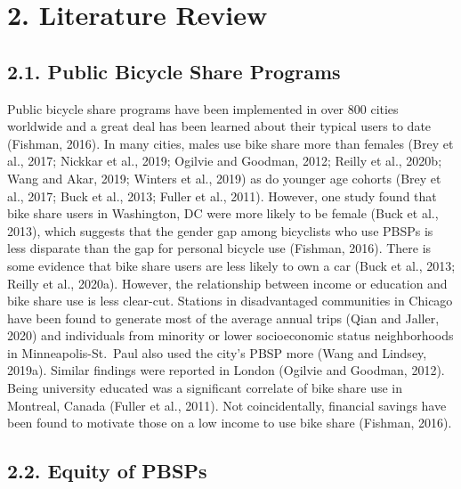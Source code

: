 \documentclass[]{elsarticle} %
\begin{document}
\hypertarget{literature-review}{%
\section{2. Literature Review}\label{literature-review}}

\hypertarget{public-bicycle-share-programs}{%
\subsection{2.1. Public Bicycle Share
Programs}\label{public-bicycle-share-programs}}

Public bicycle share programs have been implemented in over 800 cities
worldwide and a great deal has been learned about their typical users to
date (Fishman, 2016). In many cities, males use bike share more than
females (Brey et al., 2017; Nickkar et al., 2019; Ogilvie and Goodman,
2012; Reilly et al., 2020b; Wang and Akar, 2019; Winters et al., 2019)
as do younger age cohorts (Brey et al., 2017; Buck et al., 2013; Fuller
et al., 2011). However, one study found that bike share users in
Washington, DC were more likely to be female (Buck et al., 2013), which
suggests that the gender gap among bicyclists who use PBSPs is less
disparate than the gap for personal bicycle use (Fishman, 2016). There
is some evidence that bike share users are less likely to own a car
(Buck et al., 2013; Reilly et al., 2020a). However, the relationship
between income or education and bike share use is less clear-cut.
Stations in disadvantaged communities in Chicago have been found to
generate most of the average annual trips (Qian and Jaller, 2020) and
individuals from minority or lower socioeconomic status neighborhoods in
Minneapolis-St.~Paul also used the city's PBSP more (Wang and Lindsey,
2019a). Similar findings were reported in London (Ogilvie and Goodman,
2012). Being university educated was a significant correlate of bike
share use in Montreal, Canada (Fuller et al., 2011). Not coincidentally,
financial savings have been found to motivate those on a low income to
use bike share (Fishman, 2016).

\hypertarget{equity-of-pbsps}{%
\subsection{2.2. Equity of PBSPs}\label{equity-of-pbsps}}
\end{document}
